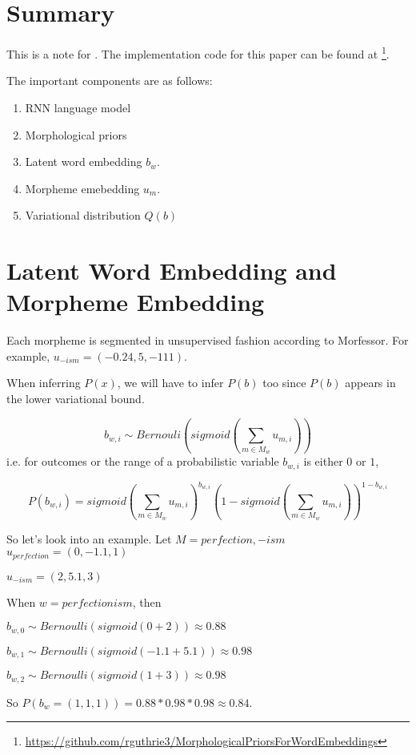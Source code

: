 \documentclass[11pt]{article}
\begin{document}
\section{Summary}

This is a note for \cite{bhatia-guthrie-eisenstein:2016:EMNLP2016}.
The implementation code for this paper can be found at \footnote{\url{https://github.com/rguthrie3/MorphologicalPriorsForWordEmbeddings}}.

The important components are as follows:
\begin{enumerate}
 \item RNN language model
 \item Morphological priors
 \item Latent word embedding $b_w$.
 \item Morpheme emebedding $u_m$.
 \item Variational distribution $Q(b)$
\end{enumerate}

\section{Latent Word Embedding and Morpheme Embedding}
Each morpheme is segmented in unsupervised fashion according to Morfessor. For example, $u_{-ism} = (-0.24, 5, -111)$.

When inferring $P(x)$, we will have to infer $P(b)$ too since $P(b)$ appears in the lower variational bound.



$$
b_{w,i} \sim Bernouli(sigmoid(\sum_{m \in M_w} u_{m,i}))
$$
i.e. for outcomes or the range of a probabilistic variable $b_{w,i}$ is either $0$ or $1$,

$$
P(b_{w,i}) = sigmoid(\sum_{m \in M_w} u_{m,i})^{b_{w,i}} (1 - sigmoid(\sum_{m \in M_w} u_{m,i}))^{1 - b_{w,i}}
$$

So let's look into an example. 
Let $M = {perfection, -ism}$
$u_{perfection} = (0, -1.1, 1)$ 

$u_{-ism} = (2, 5.1, 3)$ 

When $w = perfectionism$, then

$b_{w,0} \sim Bernoulli(sigmoid(0 + 2)) \approx 0.88$

$b_{w,1} \sim Bernoulli(sigmoid(-1.1 + 5.1)) \approx 0.98$

$b_{w,2} \sim Bernoulli(sigmoid(1 + 3)) \approx 0.98$

So $P(b_w = (1, 1, 1)) = 0.88 * 0.98 * 0.98 \approx 0.84$.
\end{document}
